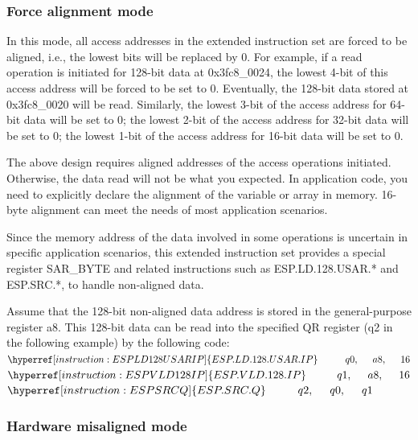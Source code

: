 \documentclass[main\_\_EN.tex]{subfiles}
\begin{document}
\subsubsection{Force alignment mode}
In this mode, all access addresses in the extended instruction set are forced to be aligned, i.e., the lowest bits will be replaced by 0. For example, if a read operation is initiated for 128-bit data at 0x3fc8\_0024, the lowest 4-bit of this access address will be forced to be set to 0. Eventually, the 128-bit data stored at 0x3fc8\_0020 will be read. Similarly, the lowest 3-bit of the access address for 64-bit data will be set to 0; the lowest 2-bit of the access address for 32-bit data will be set to 0; the lowest 1-bit of the access address for 16-bit data will be set to 0.

The above design requires aligned addresses of the access operations initiated. Otherwise, the data read will not be what you expected. In application code, you need to explicitly declare the alignment of the variable or array in memory. 16-byte alignment can meet the needs of most application scenarios.


Since the memory address of the data involved in some operations is uncertain in specific application scenarios, this extended instruction set provides a special register SAR\_BYTE and related instructions such as ESP.LD.128.USAR.* and ESP.SRC.*, to handle non-aligned data.

Assume that the 128-bit non-aligned data address is stored in the general-purpose register a8. This 128-bit data can be read into the specified QR register (q2 in the following example) by the following code:\\
$ \hyperref[instruction:ESPLD128USARIP]{ESP.LD.128.USAR.IP}\hspace{1cm}q0,\hspace{0.5cm}a8,\hspace{0.5cm}16 $ \\
$ \hyperref[instruction:ESPVLD128IP]{ESP.VLD.128.IP}\hspace{1cm}q1,\hspace{0.5cm}a8,\hspace{0.5cm}16 $ \\
$ \hyperref[instruction:ESPSRCQ]{ESP.SRC.Q}\hspace{1cm}q2,\hspace{0.5cm}q0,\hspace{0.5cm}q1 $

\subsubsection{Hardware misaligned mode}
\end{document}
